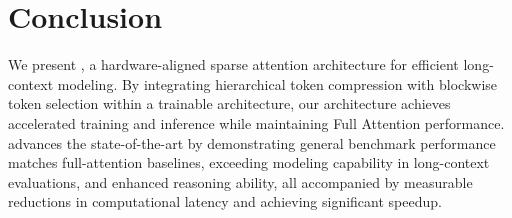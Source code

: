 \section{Conclusion}
We present \method{}, a hardware-aligned sparse attention architecture for efficient long-context modeling. By integrating hierarchical token compression with blockwise token selection within a trainable architecture, our architecture achieves accelerated training and inference while maintaining Full Attention performance. \method{} advances the state-of-the-art by demonstrating general benchmark performance matches full-attention baselines, exceeding modeling capability in long-context evaluations, and enhanced reasoning ability, all accompanied by measurable reductions in computational latency and achieving significant speedup. 
